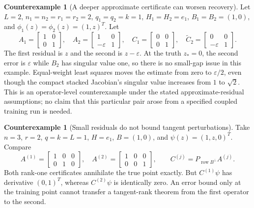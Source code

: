 \documentclass[11pt,a4paper]{article}
\theoremstyle{definition}
\theoremstyle{definition}
\newtheorem{example}[theorem]{Counterexample}
\theoremstyle{remark}\newtheorem{remark}[theorem]{Remark}
\newcommand{\row}{\operatorname{row}}\newcommand{\rank}{\operatorname{rank}}
\begin{document}
\begin{example}[A deeper approximate certificate can worsen recovery]\label{ex:noisy}
Let $L=2$, $n_1=n_2=r_1=r_2=2$, $q_1=q_2=k=1$, $H_1=H_2=e_1$, $B_1=B_2=(1,0)$, and $\phi_1(z)=\phi_2(z)=(1,z)^T$. Let
\[
A_1=\begin{bmatrix}1&0\\0&1\end{bmatrix},\quad
A_2=\begin{bmatrix}1&0\\-\varepsilon&1\end{bmatrix},\quad
C_1=\begin{bmatrix}0&0\\0&1\end{bmatrix},\quad
\widetilde C_2=\begin{bmatrix}0&0\\-\varepsilon&1\end{bmatrix}.
\]
The first residual is $z$ and the second is $z-\varepsilon$. At the truth $z_*=0$, the second error is $\varepsilon$ while $B_2$ has singular value one, so there is no small-gap issue in this example. Equal-weight least squares moves the estimate from zero to $\varepsilon/2$, even though the compact stacked Jacobian's singular value increases from $1$ to $\sqrt2$. This is an operator-level counterexample under the stated approximate-residual assumptions; no claim that this particular pair arose from a specified coupled training run is needed.
\end{example}

\begin{example}[Small residuals do not bound tangent perturbations]\label{ex:pointwise}
Take $n=3$, $r=2$, $q=k=L=1$, $H=e_1$, $B=(1,0)$, and $\psi(z)=(1,z,0)^T$. Compare
\[
A^{(1)}=\begin{bmatrix}1&0&0\\0&1&0\end{bmatrix},\quad
A^{(2)}=\begin{bmatrix}1&0&0\\0&0&1\end{bmatrix},\qquad
C^{(j)}=P_{\row B^\perp}A^{(j)}.
\]
Both rank-one certificates annihilate the true point exactly. But $C^{(1)}\psi$ has derivative $(0,1)^T$, whereas $C^{(2)}\psi$ is identically zero. An error bound only at the training point cannot transfer a tangent-rank theorem from the first operator to the second.
\end{example}
\end{document}

